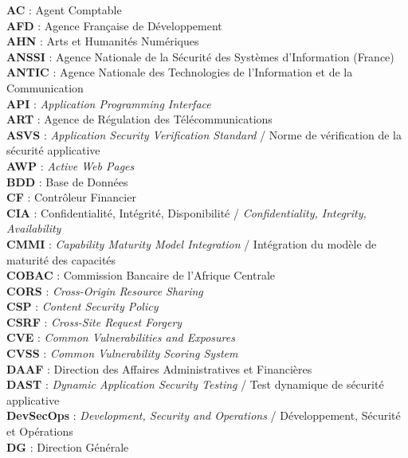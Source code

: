 \documentclass[12pt,a4paper,oneside]{report}
\begin{document}
\noindent
\textbf{AC} : Agent Comptable\\[2pt]
\textbf{AFD} : Agence Française de Développement\\[2pt]
\textbf{AHN} : Arts et Humanités Numériques\\[2pt]
\textbf{ANSSI} : Agence Nationale de la Sécurité des Systèmes d'Information (France)\\[2pt]
\textbf{ANTIC} : Agence Nationale des Technologies de l'Information et de la Communication\\[2pt]
\textbf{API} : \textit{Application Programming Interface}\\[2pt]
\textbf{ART} : Agence de Régulation des Télécommunications\\[2pt]
\textbf{ASVS} : \textit{Application Security Verification Standard} / Norme de vérification de la sécurité applicative\\[2pt]
\textbf{AWP} : \textit{Active Web Pages}\\[2pt]
\textbf{BDD} : Base de Données\\[2pt]
\textbf{CF} : Contrôleur Financier\\[2pt]
\textbf{CIA} : Confidentialité, Intégrité, Disponibilité / \textit{Confidentiality, Integrity, Availability}\\[2pt]
\textbf{CMMI} : \textit{Capability Maturity Model Integration} / Intégration du modèle de maturité des capacités\\[2pt]
\textbf{COBAC} : Commission Bancaire de l'Afrique Centrale\\[2pt]
\textbf{CORS} : \textit{Cross-Origin Resource Sharing}\\[2pt]
\textbf{CSP} : \textit{Content Security Policy}\\[2pt]
\textbf{CSRF} : \textit{Cross-Site Request Forgery}\\[2pt]
\textbf{CVE} : \textit{Common Vulnerabilities and Exposures}\\[2pt]
\textbf{CVSS} : \textit{Common Vulnerability Scoring System}\\[2pt]
\textbf{DAAF} : Direction des Affaires Administratives et Financières\\[2pt]
\textbf{DAST} : \textit{Dynamic Application Security Testing} / Test dynamique de sécurité applicative\\[2pt]
\textbf{DevSecOps} : \textit{Development, Security and Operations} / Développement, Sécurité et Opérations\\[2pt]
\textbf{DG} : Direction Générale\\[2pt]
\end{document}
